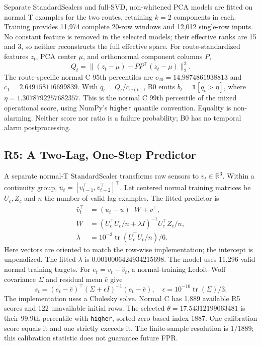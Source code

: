 \documentclass{article}
\newcommand{\ind}{\mathbf{1}}
\begin{document}
Separate StandardScalers and full-SVD, non-whitened PCA models are fitted on normal T examples for the two routes, retaining $k=2$ components in each. Training provides 11,974 complete 20-row windows and 12,012 single-row inputs. No constant feature is removed in the selected models; their effective ranks are 15 and 3, so neither reconstructs the full effective space. For route-standardized features $z_t$, PCA center $\mu$, and orthonormal component columns $P$,
\begin{equation}
 Q_t=\|(z_t-\mu)-PP^\top(z_t-\mu)\|_2^2.
\end{equation}
The route-specific normal C 95th percentiles are $c_{20}=14.9874861938813$ and $c_1=2.649158116699839$. With $q_t=Q_t/c_{w(t)}$, B0 emits $b_t=\ind[q_t>\eta]$, where $\eta=1.3078792257682357$. This is the normal C 99th percentile of the mixed operational score, using NumPy's \texttt{higher} quantile convention. Equality is non-alarming. Neither score nor ratio is a failure probability; B0 has no temporal alarm postprocessing.

\subsection{R5: A Two-Lag, One-Step Predictor}
A separate normal-T StandardScaler transforms raw sensors to $v_t\in\mathbb R^3$. Within a continuity group, $u_t=[v_{t-1}^\top,v_{t-2}^\top]^\top$. Let centered normal training matrices be $U_c,Z_c$ and $n$ the number of valid lag examples. The fitted predictor is
\begin{align}
 \widehat v_t^\top&=(u_t-\bar u)^\top W+\bar v^\top,\\
 W&=(U_c^\top U_c/n+\lambda I)^{-1}U_c^\top Z_c/n,\\
 \lambda&=10^{-3}\operatorname{tr}(U_c^\top U_c/n)/6.
\end{align}
Here vectors are oriented to match the row-wise implementation; the intercept is unpenalized. The fitted $\lambda$ is 0.0010006424934215698. The model uses 11,296 valid normal training targets. For $e_t=v_t-\widehat v_t$, a normal-training Ledoit--Wolf covariance $\Sigma$ and residual mean $\bar e$ give
\begin{equation}
 s_t=(e_t-\bar e)^\top(\Sigma+\epsilon I)^{-1}(e_t-\bar e),\quad
 \epsilon=10^{-10}\operatorname{tr}(\Sigma)/3.
\end{equation}
The implementation uses a Cholesky solve. Normal C has 1,889 available R5 scores and 122 unavailable initial rows. The selected $\theta=17.54312199063481$ is their 99.9th percentile with \texttt{higher}, sorted zero-based index 1887. One calibration score equals it and one strictly exceeds it. The finite-sample resolution is $1/1889$; this calibration statistic does not guarantee future FPR.
\end{document}
